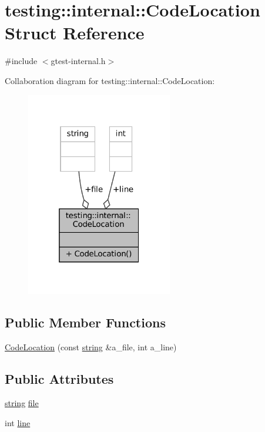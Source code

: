 \hypertarget{structtesting_1_1internal_1_1CodeLocation}{}\section{testing\+:\+:internal\+:\+:Code\+Location Struct Reference}
\label{structtesting_1_1internal_1_1CodeLocation}


{\ttfamily \#include $<$gtest-\/internal.\+h$>$}



Collaboration diagram for testing\+:\+:internal\+:\+:Code\+Location\+:
\nopagebreak
\begin{figure}[H]
\begin{center}
\leavevmode
\includegraphics[width=181pt]{structtesting_1_1internal_1_1CodeLocation__coll__graph}
\end{center}
\end{figure}
\subsection*{Public Member Functions}
\begin{DoxyCompactItemize}
\item 
\hyperlink{structtesting_1_1internal_1_1CodeLocation_ade3ecb2a54905619cd40a6856b48cd5a}{Code\+Location} (const \hyperlink{namespacetesting_1_1internal_a8e8ff5b11e64078831112677156cb111}{string} \&a\+\_\+file, int a\+\_\+line)
\end{DoxyCompactItemize}
\subsection*{Public Attributes}
\begin{DoxyCompactItemize}
\item 
\hyperlink{namespacetesting_1_1internal_a8e8ff5b11e64078831112677156cb111}{string} \hyperlink{structtesting_1_1internal_1_1CodeLocation_ab8a24d5e63295e411d37578dbb9427c0}{file}
\item 
int \hyperlink{structtesting_1_1internal_1_1CodeLocation_a01c977c7e8834a05a6d6c40b0c416045}{line}
\end{DoxyCompactItemize}


